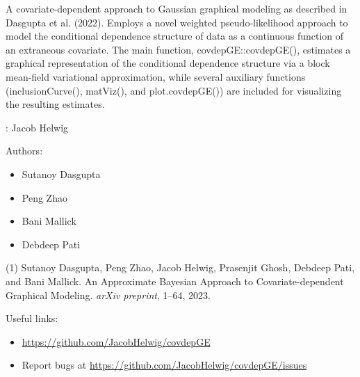 \documentclass[a4paper]{book}
\begin{document}
%
\begin{Description}\relax
A covariate-dependent approach to Gaussian graphical modeling as described in Dasgupta et al. (2022). Employs a novel weighted pseudo-likelihood approach to model the conditional dependence structure of data as a continuous function of an extraneous covariate. The main function, covdepGE::covdepGE(), estimates a graphical representation of the conditional dependence structure via a block mean-field variational approximation, while several auxiliary functions (inclusionCurve(), matViz(), and plot.covdepGE()) are included for visualizing the resulting estimates.
\end{Description}
%
\begin{Author}\relax
{}: Jacob Helwig 

Authors:
\begin{itemize}

\item{} Sutanoy Dasgupta 
\item{} Peng Zhao 
\item{} Bani Mallick 
\item{} Debdeep Pati 

\end{itemize}


\end{Author}
%
\begin{References}\relax
(1) Sutanoy Dasgupta, Peng Zhao, Jacob Helwig, Prasenjit Ghosh, Debdeep Pati,
and Bani Mallick. An Approximate Bayesian Approach to Covariate-dependent
Graphical Modeling. \emph{arXiv preprint}, 1–64, 2023.
\end{References}
%
\begin{SeeAlso}\relax
Useful links:
\begin{itemize}

\item{} \url{https://github.com/JacobHelwig/covdepGE}
\item{} Report bugs at \url{https://github.com/JacobHelwig/covdepGE/issues}

\end{itemize}


\end{SeeAlso}
\end{document}
